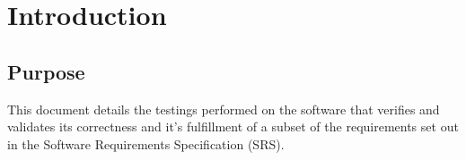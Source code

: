 \documentclass[12pt,a4paper]{article}
\begin{document}
	
	\newpage
	
	\tableofcontents
	
    \newpage
    
    \vspace{50px}
    \lstlistoflistings
	
	\newpage
	
	
	\section{Introduction}
	\subsection{Purpose}
	This document details the testings performed on the software that verifies and validates its correctness and it's fulfillment of a subset of the requirements set out in the Software Requirements Specification (SRS). 
\end{document}
